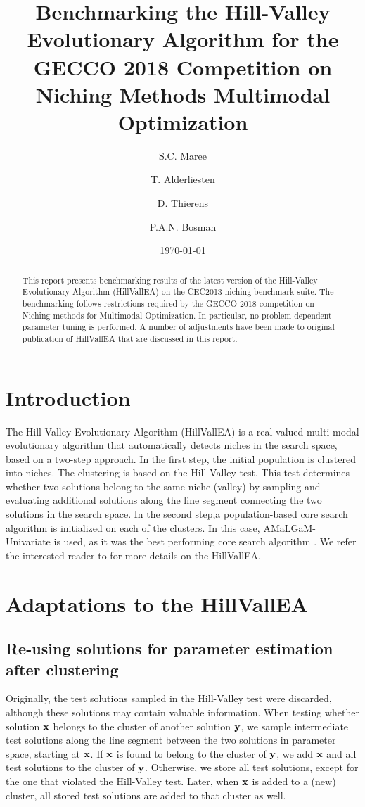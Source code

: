 \documentclass[10pt,a4paper, geometry, fullpage]{article}
\title{Benchmarking the Hill-Valley Evolutionary Algorithm for the GECCO 2018 Competition on Niching Methods Multimodal Optimization}
\date{\today}
\author[1]{S.C. Maree}
\author[1]{T. Alderliesten}
\author[2]{D. Thierens}
\author[3]{P.A.N. Bosman}
\affil[1]{Amsterdam UMC, Amsterdam, The Netherlands}
\affil[2]{Utrecht University, Utrecht, The Netherlands}
\affil[3]{Centrum Wiskunde \& Informatica, Amsterdam, The Netherlands}
\theoremstyle{plain}
\theoremstyle{remark}
\begin{document}
\maketitle



\begin{abstract}
This report presents benchmarking results of the latest version of the Hill-Valley Evolutionary Algorithm (HillVallEA) on the CEC2013 niching benchmark suite. The benchmarking follows restrictions required by the GECCO 2018 competition on Niching methods for Multimodal Optimization. In particular, no problem dependent parameter tuning is performed. A number of adjustments have been made to original publication of HillVallEA that are discussed in this report.
\end{abstract}


\section{Introduction}
The Hill-Valley Evolutionary Algorithm (HillVallEA) \cite{Maree18} is a real-valued multi-modal evolutionary algorithm that automatically detects niches in the search space, based on a two-step approach. In the first step, the initial population is clustered into niches. The clustering is based on the Hill-Valley test. This test determines whether two solutions belong to the same niche (valley) by sampling and evaluating additional solutions along the line segment connecting the two solutions in the search space. In the second step,a population-based core search algorithm is initialized on each of the clusters. In this case, AMaLGaM-Univariate \cite{bosman13} is used, as it was the best performing core search algorithm \cite{Maree18}. We refer the interested reader to \cite{Maree18} for more details on the HillVallEA. 



\section{Adaptations to the HillVallEA}

\subsection{Re-using solutions for parameter estimation after clustering}
Originally, the test solutions sampled in the Hill-Valley test were discarded, although these solutions may contain valuable information. When testing whether solution $\mathbf{x}$ belongs to the cluster of another solution $\mathbf{y}$, we sample intermediate test solutions along the line segment between the two solutions in parameter space, starting at $\mathbf{x}$. If $\mathbf{x}$ is found to belong to the cluster of $\mathbf{y}$, we add $\mathbf{x}$ and all test solutions to the cluster of $\mathbf{y}$. Otherwise, we store all test solutions, except for the one that violated the Hill-Valley test. Later, when $\mathbf{x}$ is added to a (new) cluster, all stored test solutions are added to that cluster as well. 
\end{document}
